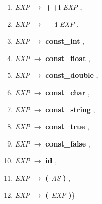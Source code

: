 \begin{enumerate}[label={\arabic*:}]
    \item \emph{EXP} $\longrightarrow$ \textbf{++i} \emph{EXP} ,
    \item \emph{EXP} $\longrightarrow$ \textbf{--\,--i} \emph{EXP} ,
    \item \emph{EXP} $\longrightarrow$ \textbf{const\_int} ,
    \item \emph{EXP} $\longrightarrow$ \textbf{const\_float} ,
    \item \emph{EXP} $\longrightarrow$ \textbf{const\_double} ,
    \item \emph{EXP} $\longrightarrow$ \textbf{const\_char} ,
    \item \emph{EXP} $\longrightarrow$ \textbf{const\_string} ,
    \item \emph{EXP} $\longrightarrow$ \textbf{const\_true} ,
    \item \emph{EXP} $\longrightarrow$ \textbf{const\_false} ,
    \item \emph{EXP} $\longrightarrow$ \textbf{id} ,
    \item \emph{EXP} $\longrightarrow$ \textbf{(} \emph{AS} \textbf{)} ,
    \item \emph{EXP} $\longrightarrow$ \textbf{(} \emph{EXP} \textbf{)}\quad\}
\end{enumerate}


